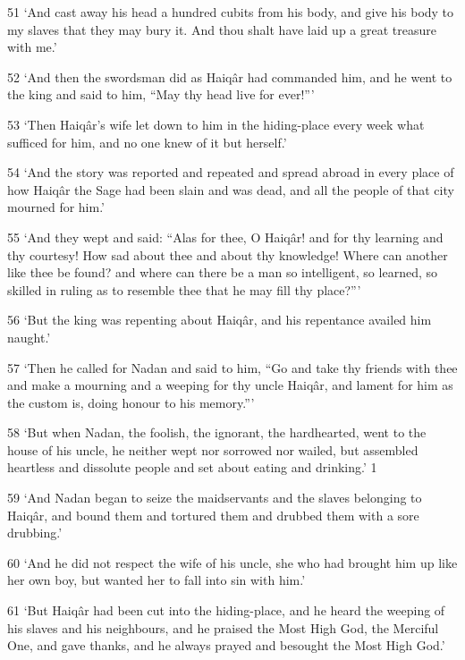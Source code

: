 \par 51 ‘And cast away his head a hundred cubits from his body, and give his body to my slaves that they may bury it. And thou shalt have laid up a great treasure with me.’

\par 52 ‘And then the swordsman did as Haiqâr had commanded him, and he went to the king and said to him, “May thy head live for ever!”’

\par 53 ‘Then Haiqâr's wife let down to him in the hiding-place every week what sufficed for him, and no one knew of it but herself.’

\par 54 ‘And the story was reported and repeated and spread abroad in every place of how Haiqâr the Sage had been slain and was dead, and all the people of that city mourned for him.’

\par 55 ‘And they wept and said: “Alas for thee, O Haiqâr! and for thy learning and thy courtesy! How sad about thee and about thy knowledge! Where can another like thee be found? and where can there be a man so intelligent, so learned, so skilled in ruling as to resemble thee that he may fill thy place?”’

\par 56 ‘But the king was repenting about Haiqâr, and his repentance availed him naught.’

\par 57 ‘Then he called for Nadan and said to him, “Go and take thy friends with thee and make a mourning and a weeping for thy uncle Haiqâr, and lament for him as the custom is, doing honour to his memory.”’

\par 58 ‘But when Nadan, the foolish, the ignorant, the hardhearted, went to the house of his uncle, he neither wept nor sorrowed nor wailed, but assembled heartless and dissolute people and set about eating and drinking.’ 1

\par 59 ‘And Nadan began to seize the maidservants and the slaves belonging to Haiqâr, and bound them and tortured them and drubbed them with a sore drubbing.’

\par 60 ‘And he did not respect the wife of his uncle, she who had brought him up like her own boy, but wanted her to fall into sin with him.’

\par 61 ‘But Haiqâr had been cut into the hiding-place, and he heard the weeping of his slaves and his neighbours, and he praised the Most High God, the Merciful One, and gave thanks, and he always prayed and besought the Most High God.’

